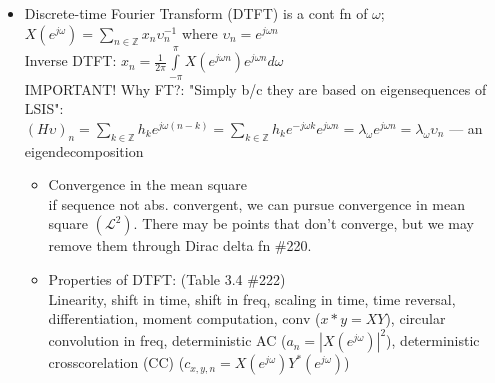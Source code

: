 \documentclass{article}
\newcommand{\cg}{\color{gray}}
\begin{document}
\begin{itemize}
\begin{itemize}
{	IMPORTANT! Most properties above depend on the sums -- must be abs. converging.
	}
	\item Filter: {\color{gray}Impulse response of a system}; Filtering: {\color{gray} convolving a seq with impulse response}.
	\item THM 3.8: (BIBO) Stability {\color{gray}An LSIS is BIBO-stable iff its impulse response is abs. summable. \\
	Limiting in $\ell^2(\mathbb{Z})$ avoids convergence issues \#209}
	\item Circular conv: {\color{gray} applies to finite-length ($N$) seqs, extended circularly	}
 \\
	{\color{gray} \footnotesize
	$(h\circledast x)_n=\sum_{k=0}^{N-1}h_kx{(n-k)\mod N}$}
	\item THM 3.10 - Equiv of circular and linear conv: \\
	{\color{gray} If length of $x$ is $M$ and of $h$ is $L$, linear and circular conv is equiv if $N\ge L+M-1$}
\end{itemize}
\item Discrete-time Fourier Transform (DTFT) {\color{gray} is a cont fn of $\omega$; $X(e^{j\omega})=\sum_{n\in\mathbb{Z}}x_n {\upsilon^{-1}_{n}}$ where $\upsilon_n=e^{j\omega n}$} \\
Inverse DTFT: {\cg $x_n=\frac{1}{2\pi}\int\limits_{-\pi}^{\pi}X(e^{j\omega n})e^{j\omega n}d\omega$}\\
{\color{gray} \footnotesize
IMPORTANT! Why FT?: "Simply b/c they are based on eigensequences of LSIS":\\
$(H\upsilon)_n=\sum_{k\in\mathbb{Z}}h_k e^{j\omega (n-k)} = \sum_{k\in\mathbb{Z}}h_k e^{-j\omega k} e^{j\omega n} = \lambda_{\omega} e^{j\omega n} = \lambda_{\omega} \upsilon_n$ \---- an eigendecomposition
}
\begin{itemize}
\item Convergence in the mean square  \\
{\color{gray} \footnotesize if sequence not abs. convergent, we can pursue convergence in mean square $(\mathcal{L}^2)$. There may be points that don't converge, but we may remove them through Dirac delta fn \#220}.
\item Properties of DTFT: (Table 3.4 \#222) \\
{\color{gray}\footnotesize 
Linearity, shift in time, shift in freq, scaling in time, time reversal, differentiation, moment computation, conv ($x\ast y=XY$), circular convolution in freq, deterministic AC ($a_n=|X(e^{j\omega})|^2$), deterministic crosscorelation (CC) ($c_{x,y,n}=X(e^{j\omega})Y^{*}(e^{j\omega})$)}

\end{itemize}
\end{itemize}
\end{document}
